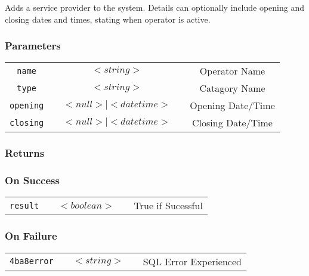 Adds a service provider to the system. Details can optionally include
opening and closing dates and times, stating when operator is active.  

\subsubsection{Parameters}

\begin{tabular}{ccccc}
\verb!name! & \vspace{15mm} & $<string>$ & \vspace{15mm} & Operator Name \\
\verb!type! & \vspace{15mm} & $<string>$ & \vspace{15mm} & Catagory Name \\
\verb!opening! & \vspace{15mm} & $<null> \mid <datetime>$ & \vspace{15mm} & Opening Date/Time \\
\verb!closing! & \vspace{15mm} & $<null> \mid <datetime>$ & \vspace{15mm} & Closing Date/Time \\
\end{tabular}

\subsubsection{Returns}

\subsubsection{On Success}

\begin{tabular}{ccccc}
\verb!result! & \vspace{15mm} & $<boolean>$ & \vspace{15mm} & True if Sucessful \\
\end{tabular}

\subsubsection{On Failure}

\begin{tabular}{ccccc}
\verb!4ba8error! & \vspace{15mm} & $<string>$ & \vspace{15mm} & SQL Error Experienced \\
\end{tabular}


